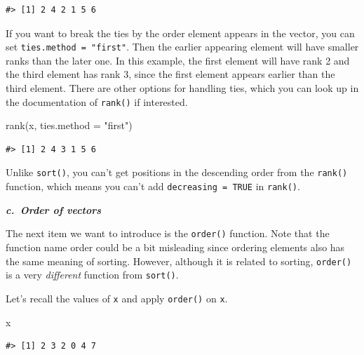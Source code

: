 \documentclass[
]{book}
\newenvironment{Shaded}{\begin{snugshade}}{\end{snugshade}}
\newcommand{\AttributeTok}[1]{\textcolor[rgb]{0.77,0.63,0.00}{#1}}
\newcommand{\FunctionTok}[1]{\textcolor[rgb]{0.00,0.00,0.00}{#1}}
\newcommand{\NormalTok}[1]{#1}
\newcommand{\StringTok}[1]{\textcolor[rgb]{0.31,0.60,0.02}{#1}}
\newenvironment{infobox}[1]
  {
  \begin{itemize}
  \renewcommand{\labelitemi}{
    \raisebox{-.7\height}[0pt][0pt]{
      {\setkeys{Gin}{width=3em,keepaspectratio}
        \texttt{[image: pics/\#1]}}
    }
  }
  \setlength{\fboxsep}{1em}
  \begin{blackbox}
  \item
  }
  {
  \end{blackbox}
  \end{itemize}
  }
\newenvironment{blackbox}{
  \definecolor{shadecolor}{rgb}{0, 0, 0}  %
  \color{white}
  \begin{shaded}}
 {\end{shaded}}
\begin{document}
\begin{verbatim}
#> [1] 2 4 2 1 5 6
\end{verbatim}

If you want to break the ties by the order element appears in the vector, you can set \texttt{ties.method\ =\ "first"}. Then the earlier appearing element will have smaller ranks than the later one. In this example, the first element will have rank 2 and the third element has rank 3, since the first element appears earlier than the third element. There are other options for handling ties, which you can look up in the documentation of \texttt{rank()} if interested.

\begin{Shaded}
\begin{Highlighting}[]
\FunctionTok{rank}\NormalTok{(x, }\AttributeTok{ties.method =} \StringTok{"first"}\NormalTok{)}
\end{Highlighting}
\end{Shaded}

\begin{verbatim}
#> [1] 2 4 3 1 5 6
\end{verbatim}

\begin{infobox}{caution}
Unlike \texttt{sort()}, you can't get positions in the descending order from the \texttt{rank()} function, which means you can't add \texttt{decreasing\ =\ TRUE} in \texttt{rank()}.

\end{infobox}

\textbf{\emph{c.~Order of vectors}}

The next item we want to introduce is the \texttt{order()} function. Note that the function name order could be a bit misleading since ordering elements also has the same meaning of sorting. However, although it is related to sorting, \texttt{order()} is a very \emph{different} function from \texttt{sort()}.

Let's recall the values of \texttt{x} and apply \texttt{order()} on \texttt{x}.

\begin{Shaded}
\begin{Highlighting}[]
\NormalTok{x}
\end{Highlighting}
\end{Shaded}

\begin{verbatim}
#> [1] 2 3 2 0 4 7
\end{verbatim}
\end{document}
